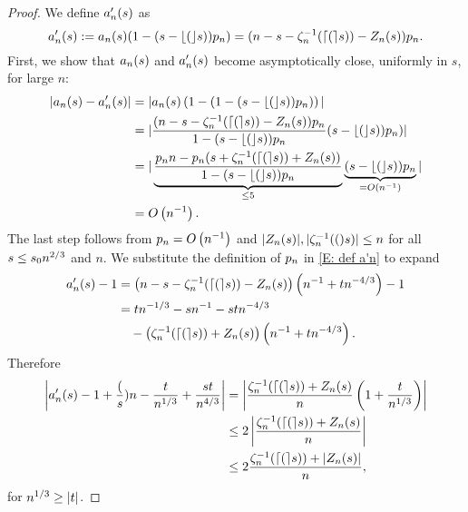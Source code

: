 \begin{proof} \label{P: limit An}
	We define $a'_n(s)$ as
	\begin{equation} \label{E: def a'n}
		a'_n(s) := a_n(s) (1 - (s - \lfloor(\rfloor s))p_n) = (n - s - \zeta^{-1}_n(\lceil(\rceil s)) - Z_n(s)) p_n.
	\end{equation}
	First, we show that $a_n(s)$ and $a'_n(s)$ become asymptotically close, uniformly in $s$, for large $n$:
	\begin{equation} \label{E: convergence an amn}
	\begin{aligned}
	|a_n(s) - a'_n(s)|
	&= |a_n(s)\left( 1-(1 - (s - \lfloor(\rfloor s))p_n) \right)| \\
	&= | \frac{(n - s - \zeta^{-1}_n(\lceil(\rceil s)) - Z_n(s))p_n}{1-(s - \lfloor(\rfloor s))p_n} (s - \lfloor(\rfloor s))p_n) | \\
	&= |\underbrace{\frac{p_n n - p_n(s + \zeta^{-1}_n(\lceil(\rceil s)) + Z_n(s))}{1-(s - \lfloor(\rfloor s))p_n}}_{\leq 5} 
		\underbrace{(s - \lfloor(\rfloor s))p_n}_{=O\left(n^{-1}\right)} |\\
	&= O\left(n^{-1}\right).
	\end{aligned}
	\end{equation}
	The last step follows from $p_n = O\left(n^{-1}\right)$ and $|Z_n(s)|, |\zeta^{-1}_n(()s)| \leq n$ for all $s \leq s_0n^{2 / 3}$ and $n$.
	We substitute the definition of $p_n$ in \eqref{E: def a'n} to expand
	\begin{align*}
	a'_n(s) - 1 
	&= \left( n - s - \zeta^{-1}_n(\lceil(\rceil s)) - Z_n(s) \right) \left( n^{-1} + tn^{-4 / 3} \right) - 1 \\
	&= tn^{-1 / 3} - sn^{-1} - stn^{-4 / 3} \\
	&\quad - \left( \zeta^{-1}_n(\lceil(\rceil s)) + Z_n(s) \right) \left( n^{-1} + tn^{-4 / 3} \right).
	\end{align*}
	Therefore
	\begin{equation} \label{E: an zeta Z / n} 
	\begin{aligned}
	\left| a'_n(s) - 1 + \frac(s){n} - \frac{t}{n^{1 / 3}} + \frac{st}{n^{4 / 3}} \right|
	&= \left| \frac{\zeta^{-1}_n(\lceil(\rceil s)) + Z_n(s)}{n} \left( 1 + \frac{t}{n^{1 / 3}} \right) \right| \\
	&\leq 2 \left| \frac{\zeta^{-1}_n(\lceil(\rceil s)) + Z_n(s)}{n} \right| \\
	&\leq 2 \frac{\zeta^{-1}_n(\lceil(\rceil s)) + |Z_n(s)|}{n} ,  
	\end{aligned}
	\end{equation}
	for $n^{1 / 3} \geq |t|$.

\end{proof}
